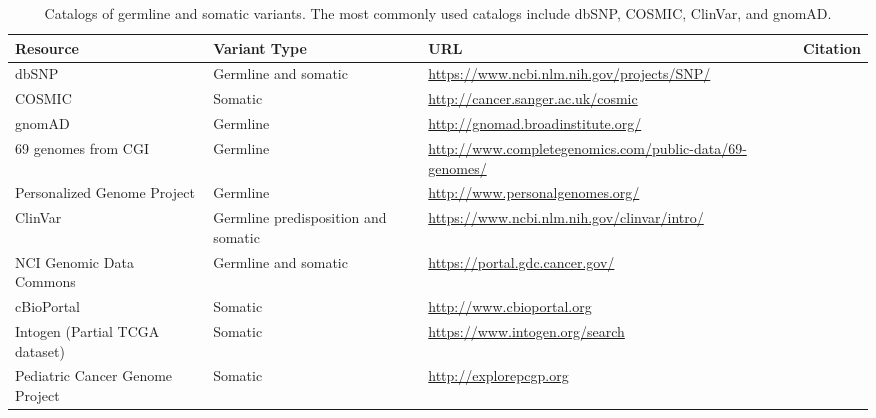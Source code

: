 \documentclass{article}
\begin{document}
\begin{table}[p]
\centering
\begin{tabularx}{\textwidth}{p{3.5cm}p{2cm}Xp{3cm}}
  \toprule
  Resource & Variant Type & URL & Citation \\
  \midrule
  dbSNP & Germline and somatic &
  \url{https://www.ncbi.nlm.nih.gov/projects/SNP/} &
  \parencite{Sherry2001-li} \\
  COSMIC & Somatic & \url{http://cancer.sanger.ac.uk/cosmic} &
  \parencite{Reva2011-en} \\
  gnomAD  & Germline & \url{http://gnomad.broadinstitute.org/} & \parencite{Lek2016-bb} \\
  69 genomes from CGI & Germline & \url{http://www.completegenomics.com/public-data/69-genomes/} & \parencite{Drmanac2010-od} \\
  Personalized Genome Project & Germline & \url{http://www.personalgenomes.org/} & \parencite{Church2005-lr} \\
  ClinVar & Germline predisposition and somatic & \url{https://www.ncbi.nlm.nih.gov/clinvar/intro/} & \parencite{Landrum2016-ul} \\
  NCI Genomic Data Commons & Germline and somatic & \url{https://portal.gdc.cancer.gov/} & \parencite{Grossman2016-sk} \\
  cBioPortal & Somatic & \url{http://www.cbioportal.org} & \parencite{Cerami2012-el,Gao2013-li} \\
  Intogen (Partial TCGA dataset) & Somatic & \url{https://www.intogen.org/search} & \parencite{Rubio-Perez2015-ek,Gonzalez-Perez2013-cl} \\
  Pediatric Cancer Genome Project  & Somatic & \url{http://explorepcgp.org} & \parencite{Downing2012-do} \\
   \bottomrule
\end{tabularx}
\caption{Catalogs of germline and somatic variants. The most commonly
  used catalogs include dbSNP, COSMIC, ClinVar, and gnomAD.}
\label{table:1}
\end{table}
\end{document}
